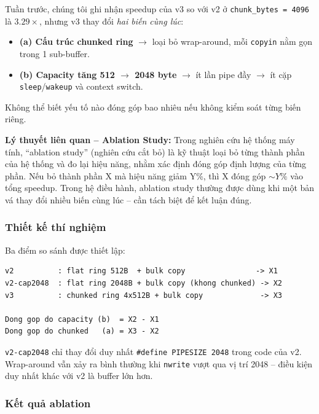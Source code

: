 \documentclass[11pt,a4paper]{article}
\begin{document}
Tuần trước, chúng tôi ghi nhận speedup của v3 so với v2 ở \texttt{chunk\_bytes = 4096} là $\mathbf{3.29\times}$, nhưng v3 thay đổi \emph{hai biến cùng lúc}:

\begin{itemize}
  \item \textbf{(a) Cấu trúc chunked ring} $\rightarrow$ loại bỏ wrap-around, mỗi \texttt{copyin} nằm gọn trong 1 sub-buffer.
  \item \textbf{(b) Capacity tăng 512 $\rightarrow$ 2048 byte} $\rightarrow$ ít lần pipe đầy $\rightarrow$ ít cặp \texttt{sleep}/\texttt{wakeup} và context switch.
\end{itemize}

Không thể biết yếu tố nào đóng góp bao nhiêu nếu không kiểm soát từng biến riêng.

\begin{callout}
\textbf{Lý thuyết liên quan -- Ablation Study:} Trong nghiên cứu hệ thống máy tính, ``ablation study'' (nghiên cứu cắt bỏ) là kỹ thuật loại bỏ từng thành phần của hệ thống và đo lại hiệu năng, nhằm xác định đóng góp định lượng của từng phần. Nếu bỏ thành phần X mà hiệu năng giảm Y\%, thì X đóng góp $\sim Y\%$ vào tổng speedup. Trong hệ điều hành, ablation study thường được dùng khi một bản vá thay đổi nhiều biến cùng lúc -- cần tách biệt để kết luận đúng.
\end{callout}

\subsubsection{Thiết kế thí nghiệm}

Ba điểm so sánh được thiết lập:

\begin{lstlisting}[style=plain]
v2          : flat ring 512B  + bulk copy                -> X1
v2-cap2048  : flat ring 2048B + bulk copy (khong chunked) -> X2
v3          : chunked ring 4x512B + bulk copy             -> X3

Dong gop do capacity (b)  = X2 - X1
Dong gop do chunked   (a) = X3 - X2
\end{lstlisting}

\texttt{v2-cap2048} chỉ thay đổi duy nhất \texttt{\#define PIPESIZE 2048} trong code của v2. Wrap-around vẫn xảy ra bình thường khi \texttt{nwrite} vượt qua vị trí 2048 -- điều kiện duy nhất khác với v2 là buffer lớn hơn.

\subsubsection{Kết quả ablation}
\end{document}
